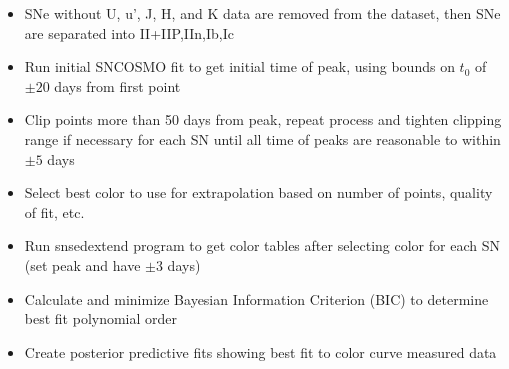 \begin{itemize}
	\item SNe without U, u', J, H, and K data are removed from the dataset, then SNe are separated into II+IIP,IIn,Ib,Ic
	\item Run initial SNCOSMO fit to get initial time of peak, using bounds on $t_0$ of $\pm20$ days from first point
	\item Clip points more than 50 days from peak, repeat process and tighten clipping range if necessary for each SN until all time of peaks are reasonable to within $\pm 5$ days
	\item Select best color to use for extrapolation based on number of points, quality of fit, etc. 
	\item Run snsedextend program to get color tables after selecting color for each SN (set peak and have $\pm3$ days)
	\item Calculate and minimize Bayesian Information Criterion (BIC) to determine best fit polynomial order
	\item Create posterior predictive fits showing best fit to color curve measured data
\end{itemize}

\renewcommand{\labelitemii}{-}


